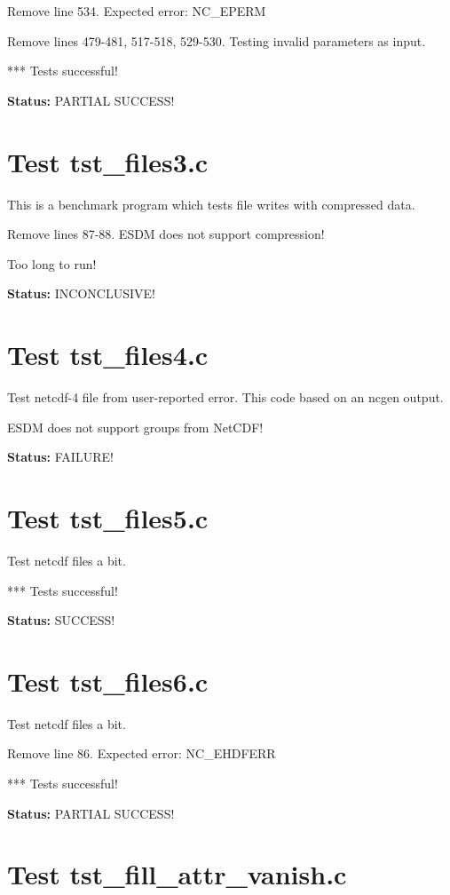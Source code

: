 Remove line 534. Expected error: NC\_EPERM

Remove lines 479-481, 517-518, 529-530. Testing invalid parameters as input.

*** Tests successful!

{\bf \large Status: } PARTIAL SUCCESS!

\section{Test tst\_files3.c}

This is a benchmark program which tests file writes with compressed data.

Remove lines 87-88. ESDM does not support compression!

Too long to run!

{\bf \large Status: } INCONCLUSIVE!

\section{Test tst\_files4.c}

Test netcdf-4 file from user-reported error. This code based on an ncgen output.

ESDM does not support groups from NetCDF!

{\bf \large Status: } FAILURE!

\section{Test tst\_files5.c}

Test netcdf files a bit.

*** Tests successful!

{\bf \large Status: } SUCCESS!

\section{Test tst\_files6.c}

Test netcdf files a bit.

Remove line 86. Expected error: NC\_EHDFERR

*** Tests successful!

{\bf \large Status: } PARTIAL SUCCESS!

\section{Test tst\_fill\_attr\_vanish.c}

